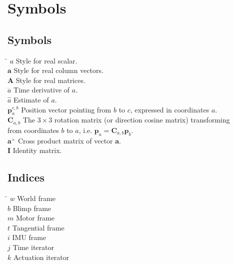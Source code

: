 \chapter*{Symbols}
\label{sec:symbols}

\section*{Symbols}

\begin{tabbing}
 \hspace*{1.6cm} \= \kill
  $a$                     \> Style for real scalar. \\[0.5ex]
  $\mathbf{a}$            \> Style for real column vectors. \\[0.5ex]
  $\mathbf{A}$            \> Style for real matrices. \\[0.5ex]
  $\dot{a}$               \> Time derivative of $a$. \\[0.5ex]
  $\hat{a}$               \> Estimate of $a$. \\[0.5ex]
  $\mathbf{p}^{c,b}_a$    \> Position vector pointing from $b$ to $c$, expressed in coordinates $a$. \\[0.5ex]
  $\mathbf{C}_{a,b}$      \> The $3\times3$ rotation matrix (or direction cosine matrix) transforming \\
                          \> from coordinates $b$ to $a$, i.e. 
                          $\mathbf{p}_a=\mathbf{C}_{a,b}\mathbf{p}_b$. \\ [0.5ex]
  $\mathbf{a}^\times$     \> Cross product matrix of vector $\mathbf{a}$.\\ [0.5ex]
  $\mathbf{I}$            \> Identity matrix.\\ [0.5ex]

\end{tabbing}

\section*{Indices}

\begin{tabbing}
 \hspace*{1.6cm}  \= \kill
 $w$ \> World frame \\[0.5ex]
 $b$ \> Blimp frame \\[0.5ex]
 $m$ \> Motor frame \\[0.5ex]
 $t$ \> Tangential frame \\[0.5ex]
 $i$ \> IMU frame \\[0.5ex]
 $j$ \> Time iterator \\[0.5ex]
 $k$ \> Actuation iterator \\[0.5ex]
\end{tabbing}

